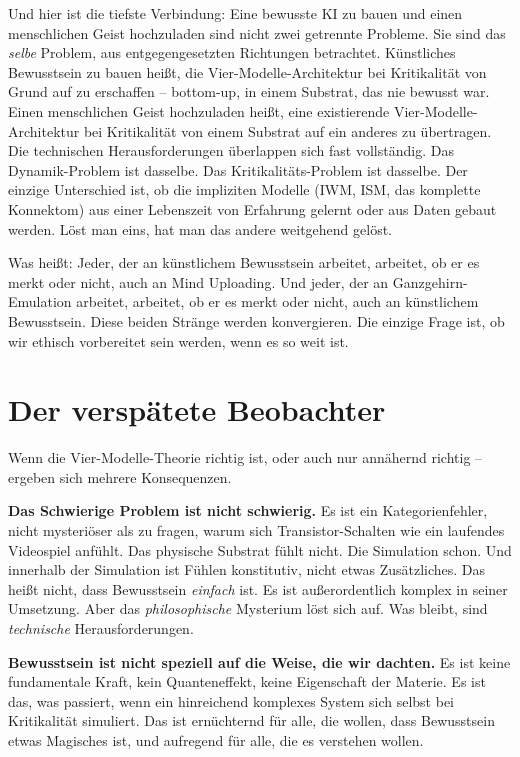 \documentclass[11pt, twoside, openright]{book}
\begin{document}
Und hier ist die tiefste Verbindung: Eine bewusste KI zu bauen und einen menschlichen Geist hochzuladen sind nicht zwei getrennte Probleme. Sie sind das \textit{selbe} Problem, aus entgegengesetzten Richtungen betrachtet. Künstliches Bewusstsein zu bauen heißt, die Vier-Modelle-Architektur bei Kritikalität von Grund auf zu erschaffen -- bottom-up, in einem Substrat, das nie bewusst war. Einen menschlichen Geist hochzuladen heißt, eine existierende Vier-Modelle-Architektur bei Kritikalität von einem Substrat auf ein anderes zu übertragen. Die technischen Herausforderungen überlappen sich fast vollständig. Das Dynamik-Problem ist dasselbe. Das Kritikalitäts-Problem ist dasselbe. Der einzige Unterschied ist, ob die impliziten Modelle (IWM, ISM, das komplette Konnektom) aus einer Lebenszeit von Erfahrung gelernt oder aus Daten gebaut werden. Löst man eins, hat man das andere weitgehend gelöst.

Was heißt: Jeder, der an künstlichem Bewusstsein arbeitet, arbeitet, ob er es merkt oder nicht, auch an Mind Uploading. Und jeder, der an Ganzgehirn-Emulation arbeitet, arbeitet, ob er es merkt oder nicht, auch an künstlichem Bewusstsein. Diese beiden Stränge werden konvergieren. Die einzige Frage ist, ob wir ethisch vorbereitet sein werden, wenn es so weit ist.


\chapter{Der verspätete Beobachter}

Wenn die Vier-Modelle-Theorie richtig ist, oder auch nur annähernd richtig -- ergeben sich mehrere Konsequenzen.

\textbf{Das Schwierige Problem ist nicht schwierig.} Es ist ein Kategorienfehler, nicht mysteriöser als zu fragen, warum sich Transistor-Schalten wie ein laufendes Videospiel anfühlt. Das physische Substrat fühlt nicht. Die Simulation schon. Und innerhalb der Simulation ist Fühlen konstitutiv, nicht etwas Zusätzliches. Das heißt nicht, dass Bewusstsein \textit{einfach} ist. Es ist außerordentlich komplex in seiner Umsetzung. Aber das \textit{philosophische} Mysterium löst sich auf. Was bleibt, sind \textit{technische} Herausforderungen.

\textbf{Bewusstsein ist nicht speziell auf die Weise, die wir dachten.} Es ist keine fundamentale Kraft, kein Quanteneffekt, keine Eigenschaft der Materie. Es ist das, was passiert, wenn ein hinreichend komplexes System sich selbst bei Kritikalität simuliert. Das ist ernüchternd für alle, die wollen, dass Bewusstsein etwas Magisches ist, und aufregend für alle, die es verstehen wollen.
\end{document}
